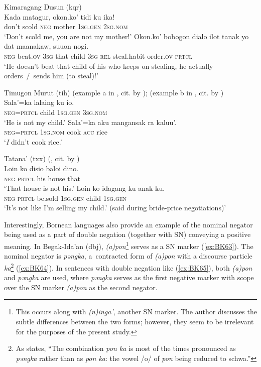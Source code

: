 \documentclass[output=paper]{langsci/langscibook}
\begin{document}
\ea Kimaragang Dusun (kqr) \citep[7--8]{kroeger2014a} \label{ex:BK60}\\
  \ea
	\gll Kada		matagur,	okon.ko’		tidi		ku			ika!\\
	don’t		scold			\textsc{neg}			mother	\textsc{1sg.gen}	\textsc{2sg.nom}\\
	\glt `Don’t scold me, you are not my mother!'
  \ex
	\gll Okon.ko’	bobogon			dialo		ilot	tanak		yo	dat		maanakaw,		suuon		nogi.\\
	\textsc{neg}			beat.\textsc{ov}			\textsc{3sg}		that	child		\textsc{3sg}	\textsc{rel}	steal.habit		order.\textsc{ov}		\textsc{prtcl}\\
	\glt `He doesn’t beat that child of his who keeps on stealing, he actually orders / sends him (to steal)!'
\z \z

\ea Timugon Murut (tih) (example a in \citealp[10]{brewis1988a}, cit. by \citealp[8]{kroeger2014a}); (example b in \citealp[612]{brewis2004a}, cit. by \citealp[8]{kroeger2014a}) \label{ex:BK61}\\
  \ea
	\gll Sala’=ka	lalaing	ku				io.\\
	\textsc{neg=prtcl}	child		\textsc{1sg.gen}		\textsc{3sg.nom}\\
	\glt `He is not my child.'
  \ex
	\gll Sala’=ka	aku			mangansak		ra		kaluu’.\\
	\textsc{neg=prtcl}	\textsc{1sg.nom}	cook				\textsc{acc}	rice\\
	\glt `\textit{I} didn’t cook rice.'
\z \z

\ea Tatana’ (txx) (\citealp[6, 44]{chan1989a}, cit. by \citealp[11]{kroeger2014a}) \label{ex:BK62}\\
  \ea
	\gll Loin	ko			disio	baloi		dino.\\
	\textsc{neg}	\textsc{prtcl}	his		house		that\\
	\glt `That house is not his.'
  \ex
	\gll Loin	ko			idagang	ku				anak	ku.\\
	\textsc{neg}	\textsc{prtcl}	be.sold	\textsc{1sg.gen}		child	\textsc{1sg.gen}\\
	\glt `It’s not like I’m selling my child.’ (said during bride-price negotiations)'
\z \z

Interestingly, Bornean languages also provide an example of the nominal negator being used as a part of double negation (together with SN) conveying a positive meaning. In Begak-Ida’an (dbj), \textit{(a)pon}\footnote{This occurs along with \textit{(n)inga’}, another SN marker. The author discusses the subtle differences between the two forms; however, they seem to be irrelevant for the purposes of the present study.} serves as a SN marker (\ref{ex:BK63}). The nominal negator is \textit{pǝngka}, a contracted form of \textit{(a)pon} with a discourse particle \textit{ka}\footnote{As \citet[304]{goudswaard2005a} states, “The combination \textit{pon ka} is most of the times pronounced as \textit{pǝngka} rather than as \textit{pon ka}: the vowel /o/ of \textit{pon} being reduced to schwa.”} (\ref{ex:BK64}). In sentences with double negation like (\ref{ex:BK65}), both \textit{(a)pon} and \textit{pǝngka} are used, where \textit{pǝngka} serves as the first negative marker with scope over the SN marker \textit{(a)pon} as the second negator.
\end{document}
